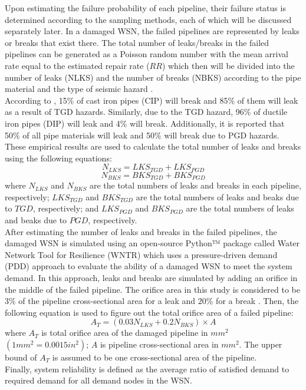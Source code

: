     Upon estimating the failure probability of each pipeline, their failure status is determined according to the sampling methods, each of which will be discussed separately later. In a damaged WSN, the failed pipelines are represented by leaks or breaks that exist there. The total number of leaks/breaks in the failed pipelines can be generated as a Poisson random number with the mean arrival rate equal to the estimated repair rate ($RR$) \cite{hwang_seismic_1998} which then will be divided into the number of leaks (NLKS) and the number of breaks (NBKS) according to the pipe material and the type of seismic hazard \cite{hwang_seismic_1998}.\\ 
    According to \cite{ballantyne_earthquake_1991}, 15\% of cast iron pipes (CIP) will break and 85\% of them will leak as a result of TGD hazards. Similarly, due to the TGD hazard, 96\% of ductile iron pipes (DIP) will leak and 4\% will break. Additionally, it is reported that 50\% of all pipe materials will leak and 50\% will break due to PGD hazards. These empirical results are used to calculate the total number of leaks and breaks using the following equations: 
    $$N_{LKS}=LKS_{TGD}+LKS_{PGD}$$
    $$N_{BKS}=BKS_{TGD}+BKS_{PGD}$$
    where $N_{LKS}$ and $N_{BKS}$ are the total numbers of leaks and breaks in each pipeline, respectively; $LKS_{TGD}$ and $BKS_{TGD}$ are the total numbers of leaks and beaks due to $TGD$, respectively; and $LKS_{PGD}$ and $BKS_{PGD}$ are the total numbers of leaks and beaks due to $PGD$, respectively. \\ 
    After estimating the number of leaks and breaks in the failed pipelines, the damaged WSN is simulated using an open-source Python™ package called Water Network Tool for Resilience (WNTR) \cite{klise_water_2017} which uses a pressure-driven demand (PDD) approach to evaluate the ability of a damaged WSN to meet the system demand. In this approach, leaks and breaks are simulated by adding an orifice in the middle of the failed pipeline. The orifice area in this study is considered to be $3\%$ of the pipeline cross-sectional area for a leak and $20\%$ for a break \cite{hwang_seismic_1998}. Then, the following equation is used to figure out the total orifice area of a failed pipeline: 
    $$ A_T=(0.03 N_{LKS}+0.2 N_{BKS}) \times A $$
    where $A_T$ is total orifice area of the damaged pipeline in $mm^2$ $(1 mm^2 = 0.0015 in^2)$; $A$ is pipeline cross-sectional area in $mm^2$. The upper bound of $A_T$ is assumed to be one cross-sectional area of the pipeline. \\
    Finally, system reliability is defined as the average ratio of satisfied demand to required demand for all demand nodes in the WSN.

